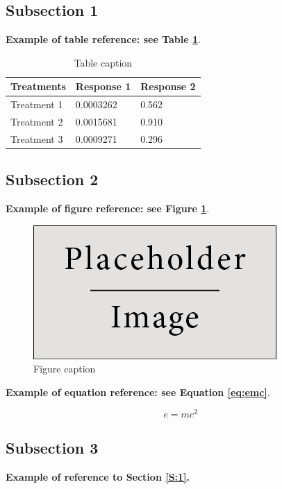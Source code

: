 \documentclass[12pt]{article}
\begin{document}
\subsection{Subsection 1}

\textbf{Example of table reference: see Table \ref{tab:example}}.
\lipsum[4]

\begin{table}[h] 
\centering
\begin{tabular}{l l l}
\hline
\textbf{Treatments} & \textbf{Response 1} & \textbf{Response 2}\\
\hline
Treatment 1 & 0.0003262 & 0.562 \\
Treatment 2 & 0.0015681 & 0.910 \\
Treatment 3 & 0.0009271 & 0.296 \\
\hline
\end{tabular}
\caption{Table caption}
\label{tab:example}
\end{table}

\subsection{Subsection 2}

\textbf{Example of figure reference: see Figure \ref{fig:example}}. 
\lipsum[5]

\begin{figure}[ht]
\centering\includegraphics[width=0.4\linewidth]{placeholder}
\caption{Figure caption}
\label{fig:example}
\end{figure}

\textbf{Example of equation reference: see Equation \eqref{eq:emc}}. 
\lipsum[6]

\begin{equation} 
\label{eq:emc}
e = mc^2
\end{equation}

\subsection{Subsection 3}

\textbf{Example of reference to Section \ref{S:1}.} 
\lipsum[7]
\lipsum[8]
\end{document}
